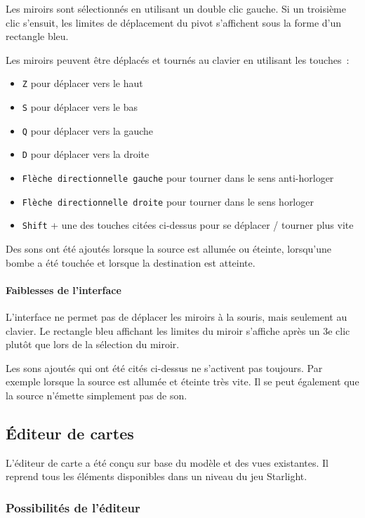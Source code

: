 \documentclass[]{article}
\begin{document}
Les miroirs sont sélectionnés en utilisant un double clic gauche.
Si un troisième clic s’ensuit, les limites de déplacement du pivot s'affichent
sous la forme d'un rectangle bleu.

Les miroirs peuvent être déplacés et tournés au clavier en utilisant les touches~:

\begin{itemize}
	\item \texttt{Z} pour déplacer vers le haut
	\item \texttt{S} pour déplacer vers le bas
	\item \texttt{Q} pour déplacer vers la gauche
	\item \texttt{D} pour déplacer vers la droite
	\item \texttt{Flèche directionnelle gauche} pour tourner dans le sens
		anti-horloger
	\item \texttt{Flèche directionnelle droite} pour tourner dans le sens
		horloger
    \item \texttt{Shift} + une des touches citées ci-dessus pour se déplacer / tourner
        plus vite
\end{itemize}

Des sons ont été ajoutés lorsque la source est allumée ou éteinte, 
lorsqu'une bombe a été touchée et lorsque la destination
est atteinte.

\paragraph{Faiblesses de l'interface} 

L'interface ne permet pas de déplacer les miroirs à la souris, mais seulement au clavier.
Le rectangle bleu affichant les limites du miroir s'affiche après un 3e clic plutôt 
que lors de la sélection du miroir.

Les sons ajoutés qui ont été cités ci-dessus ne s'activent pas toujours.
Par exemple lorsque la source est allumée et éteinte très vite.
Il se peut également que la source n'émette simplement pas de son.


\subsection{\label{Editeur}Éditeur de cartes}

L’éditeur de carte a été conçu sur base du modèle et des vues existantes.
Il reprend tous les éléments disponibles dans un niveau du jeu Starlight.

\subsubsection{Possibilités de l’éditeur}
\end{document}
